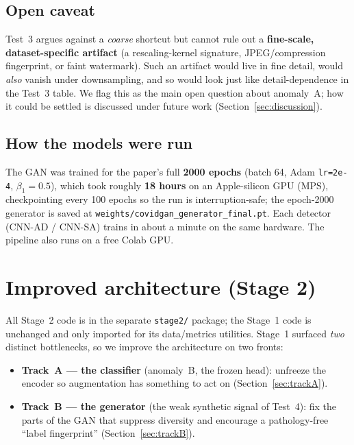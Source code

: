 \documentclass[11pt]{article}
\newcommand{\code}[1]{\texttt{#1}}
\begin{document}
\subsection{Open caveat}
\label{sec:caveat}
Test~3 argues against a \emph{coarse} shortcut but cannot rule out a
\textbf{fine-scale, dataset-specific artifact} (a rescaling-kernel signature,
JPEG/compression fingerprint, or faint watermark). Such an artifact would live in
fine detail, would \emph{also} vanish under downsampling, and so would look just
like detail-dependence in the Test~3 table. We flag this as the main open question
about anomaly~A; how it could be settled is discussed under future work
(Section~\ref{sec:discussion}).

\subsection{How the models were run}
The GAN was trained for the paper's full \textbf{2000 epochs} (batch 64,
Adam \code{lr=2e-4}, $\beta_1=0.5$), which took roughly \textbf{18 hours} on an
Apple-silicon GPU (MPS), checkpointing every 100 epochs so the run is
interruption-safe; the epoch-2000 generator is saved at
\code{weights/covidgan\_generator\_final.pt}. Each detector (CNN-AD / CNN-SA)
trains in about a minute on the same hardware. The pipeline also runs on a free
Colab GPU.

\section{Improved architecture (Stage 2)}

All Stage~2 code is in the separate \code{stage2/} package; the Stage~1 code is
unchanged and only imported for its data/metrics utilities. Stage~1 surfaced
\emph{two} distinct bottlenecks, so we improve the architecture on two fronts:

\begin{itemize}[nosep,leftmargin=1.4em]
  \item \textbf{Track~A --- the classifier} (anomaly~B, the frozen head): unfreeze
        the encoder so augmentation has something to act on
        (Section~\ref{sec:trackA}).
  \item \textbf{Track~B --- the generator} (the weak synthetic signal of Test~4):
        fix the parts of the GAN that suppress diversity and encourage a
        pathology-free ``label fingerprint'' (Section~\ref{sec:trackB}).
\end{itemize}
\end{document}
